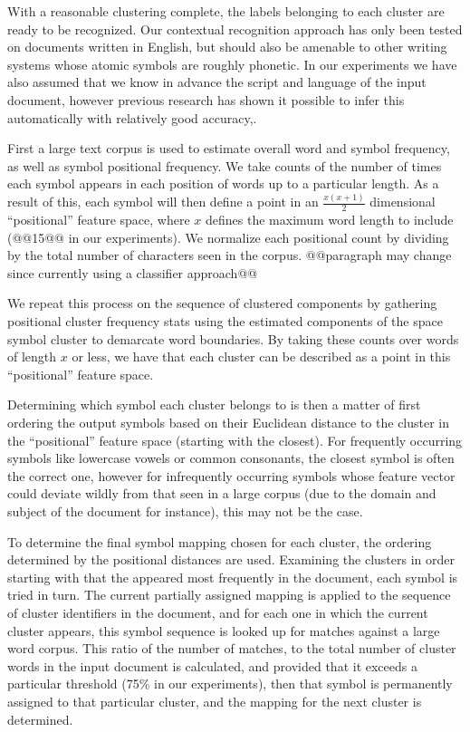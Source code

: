 \documentclass[times, 10pt,twocolumn]{article}
\begin{document}

With a reasonable clustering complete, the labels belonging to each cluster are
ready to be recognized.  Our contextual recognition approach has only been
tested on documents written in English, but should also be amenable to other
writing systems whose atomic symbols are roughly phonetic.  In our experiments
we have also assumed that we know in advance the script and language of the
input document, however previous research has shown it possible to infer this
automatically with relatively good accuracy\cite{sibun1994},\cite{hochberg1997}.

First a large text corpus is used to estimate overall word and symbol frequency,
as well as symbol positional frequency.  We take counts of the number of times
each symbol appears in each position of words up to a particular length.  As
a result of this, each symbol will then define a point in an $\frac{x
(x+1)}{2}$ dimensional ``positional'' feature space, where $x$ defines the
maximum word length to include (@@15@@ in our experiments).  We normalize each 
positional count by dividing by the total number of characters seen in the 
corpus.  @@paragraph may change since currently using a classifier approach@@

We repeat this process on the sequence of clustered components by gathering 
positional cluster frequency stats using the estimated components of the space 
symbol cluster to demarcate word boundaries.  By taking these counts over words
of length $x$ or less, we have that each cluster can be described as a point in
this ``positional'' feature space.

Determining which symbol each cluster belongs to is then a matter of first
ordering the output symbols based on their Euclidean distance to the cluster in
the ``positional'' feature space (starting with the closest).  For frequently
occurring symbols like lowercase vowels or common consonants, the closest
symbol is often the correct one, however for infrequently occurring symbols
whose feature vector could deviate wildly from that seen in a large corpus (due
to the domain and subject of the document for instance), this may not be the
case.

To determine the final symbol mapping chosen for each cluster, the ordering
determined by the positional distances are used.  Examining the clusters in
order starting with that the appeared most frequently in the document, each
symbol is tried in turn.  The current partially assigned mapping is applied to
the sequence of cluster identifiers in the document, and for each one in which
the current cluster appears, this symbol sequence is looked up for matches
against a large word corpus.  This ratio of the number of matches, to the total
number of cluster words in the input document is calculated, and provided that
it exceeds a particular threshold (75\% in our experiments), then that symbol
is permanently assigned to that particular cluster, and the mapping for the
next cluster is determined.
\end{document}
